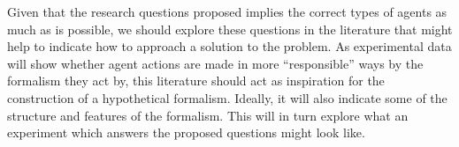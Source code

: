 Given that the research questions proposed implies the correct types of agents as much as is possible, we should explore these questions in the literature that might help to indicate how to approach a solution to the problem. As experimental data will show whether agent actions are made in more ``responsible'' ways by the formalism they act by, this literature should act as inspiration for the construction of a hypothetical formalism. Ideally, it will also indicate some of the structure and features of the formalism. This will in turn explore what an experiment which answers the proposed questions might look like.\par


% 
% 
